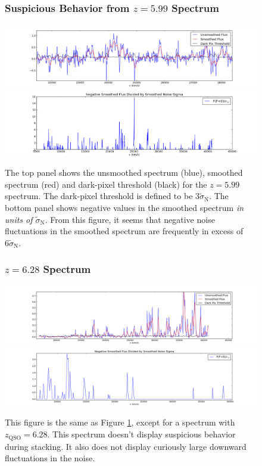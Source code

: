 \documentclass[11pt]{article}
\begin{document}
\begin{figure}[h]
\subsubsection*{Suspicious Behavior from $z = 5.99$ Spectrum}
  \centering
  \includegraphics[width=18cm]{z599_Spectra.png}
  \includegraphics[width=18cm]{z599_NoiseSignificance.png}
  \caption{The top panel shows the unsmoothed spectrum (blue), smoothed spectrum (red) and dark-pixel threshold (black) for the $z = 5.99$ spectrum. The dark-pixel threshold is defined to be $3\tilde{\sigma}_{\text{N}}$. The bottom panel shows negative values in the smoothed spectrum \textit{in units of $\tilde{\sigma}_{\text{N}}$}. From this figure, it seems that negative noise fluctuations in the smoothed spectrum are frequently in excess of $6\tilde{\sigma}_{\text{N}}$.}
  \label{fig:z599}
\end{figure}

\begin{figure}[h]
\subsubsection*{$z = 6.28$ Spectrum}
  \centering
  \includegraphics[width=18cm]{z628_Spectra.png}
  \includegraphics[width=18cm]{z628_NoiseSignificance.png}
  \caption{This figure is the same as Figure \ref{fig:z599}, except for a spectrum with $z_{\text{QSO}} = 6.28$. This spectrum doesn't display suspicious behavior during stacking. It also does not display curiously large downward fluctuations in the noise.}
  \label{fig:todo}
\end{figure}
\end{document}
